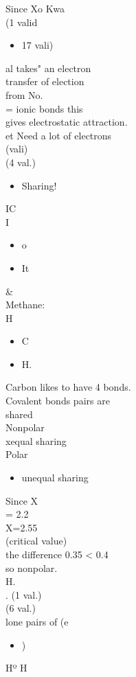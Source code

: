 \documentclass{article}
\begin{document}
Since Xo Kwa\\
(1 valid \begin{itemize}\item  17 vali)
\end{itemize}
al takes" an electron\\
transfer of election\\
from No.\\
= ionic bonds this\\
gives electrostatic attraction.\\
et Need a lot of electrons\\
(vali)\\
(4 val.)\\
\begin{itemize}\item  Sharing!
\end{itemize}
IC\\
I\begin{itemize}\item o\item It
\end{itemize}
\&\\
Methane:\\
H\begin{itemize}\item C\item H.
\end{itemize}
Carbon likes to have 4 bonds.\\
Covalent bonds pairs are\\
shared\\
Nonpolar\\
xequal sharing\\
Polar\\
\begin{itemize}\item  unequal sharing
\end{itemize}
Since X\\
= 2.2\\
X=2.55\\
(critical value)\\
the difference 0.35 < 0.4\\
so nonpolar.\\
H.\\
. (1 val.)\\
(6 val.)\\
lone pairs of (e\begin{itemize}\item )
\end{itemize}
Hº H\\
\end{document}

